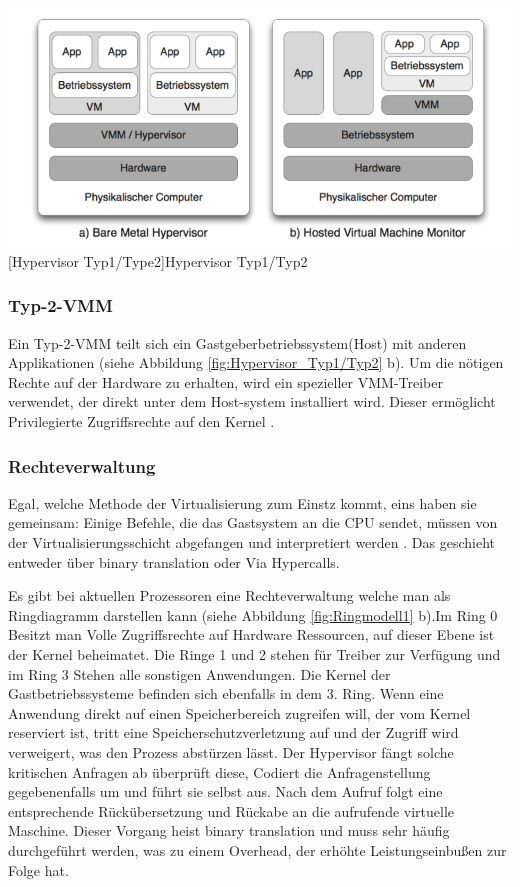 \vspace{1em}
\begin{minipage}{\linewidth}
	\centering
	\includegraphics[width=1\linewidth]{pics/Hypervisoren.PNG}
	[Hypervisor Typ1/Type2]{Hypervisor Typ1/Typ2 \cite{Meinel2011VirtualisierungMarktubersicht} }
	\label{fig:Hypervisor_Typ1/Typ2}
\end{minipage}

\subsubsection{Typ-2-VMM}
Ein Typ-2-VMM teilt sich ein Gastgeberbetriebssystem(Host) mit anderen Applikationen (siehe Abbildung \ref{fig:Hypervisor_Typ1/Typ2} b). Um die nötigen Rechte auf der Hardware zu erhalten, wird ein spezieller VMM-Treiber verwendet, der direkt unter dem Host-system installiert wird. Dieser ermöglicht Privilegierte Zugriffsrechte auf den Kernel \cite{Glatz2015Betriebssysteme}.


\subsubsection{Rechteverwaltung}
Egal, welche Methode der Virtualisierung zum Einstz kommt, eins haben sie gemeinsam: Einige Befehle, die das Gastsystem an die CPU sendet, müssen von der Virtualisierungsschicht abgefangen und interpretiert werden \cite{Glatz2015Betriebssysteme}. Das geschieht entweder über \glqq binary translation \grqq{} oder Via Hypercalls. 

 Es gibt bei aktuellen Prozessoren eine Rechteverwaltung welche man als Ringdiagramm darstellen kann (siehe Abbildung \ref{fig:Ringmodell1} b).Im Ring 0 Besitzt man Volle Zugriffsrechte auf Hardware Ressourcen, auf dieser Ebene ist der Kernel beheimatet. Die Ringe 1 und 2 stehen für Treiber zur Verfügung und im Ring 3 Stehen alle sonstigen Anwendungen. Die Kernel der Gastbetriebssysteme befinden sich ebenfalls in dem 3. Ring. Wenn eine Anwendung direkt auf einen Speicherbereich zugreifen will, der vom Kernel reserviert ist, tritt eine Speicherschutzverletzung auf und der Zugriff wird verweigert, was den Prozess abstürzen lässt. Der Hypervisor fängt solche kritischen Anfragen ab überprüft diese, Codiert die Anfragenstellung gegebenenfalls um und führt sie selbst aus. Nach dem Aufruf folgt eine entsprechende Rückübersetzung und Rückabe an die aufrufende virtuelle Maschine. Dieser Vorgang heist \glqq binary translation \grqq{} und muss sehr häufig durchgeführt werden, was zu einem Overhead, der erhöhte Leistungseinbußen zur Folge hat. 
 
